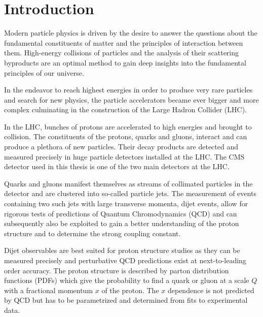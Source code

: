
\chapter{Introduction}

Modern particle physics is driven by the desire to answer the questions about the
fundamental constituents of matter and the principles of interaction between
them. High-energy collisions of particles and the analysis of their
scattering byproducts are an optimal method to gain deep insights into the
fundamental principles of our universe. 

In the endeavor to reach highest energies in order to produce very rare particles and
search for new physics, the particle accelerators became ever bigger and more
complex culminating in the construction of the Large Hadron Collider (LHC).

In the LHC, bunches of protons are accelerated to high energies and brought to
collision. The constituents of the protons, quarks and gluons, interact and can
produce a plethora of new particles. Their decay products are detected and
measured precisely in huge particle detectors installed at the LHC. The CMS
detector used in this thesis is one of the two main detectors at the LHC.

Quarks and gluons manifest themselves as streams of collimated particles in the
detector and are clustered into so-called particle jets. The measurement of
events containing two such jets with large transverse momenta, dijet events,
allow for rigorous tests of predictions of Quantum Chromodynamics (QCD) and can
subsequently also be exploited to gain a better understanding of the proton structure
and to determine the strong coupling constant.

Dijet observables are best suited for proton structure studies as they can be
measured precisely and perturbative QCD predictions exist at next-to-leading
order accuracy. The proton structure is described by parton distribution
functions (PDFs) which give the probability to find a quark or gluon at a scale
$Q$ with a fractional momentum $x$ of the proton. The $x$ dependence is not
predicted by QCD but has to be parametrized and determined from fits to
experimental data.

